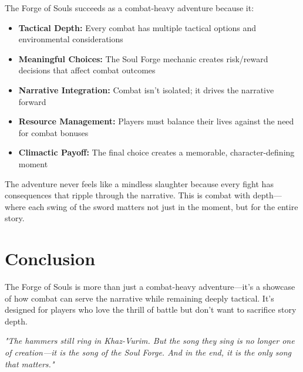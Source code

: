 \documentclass[11pt]{article}
\begin{document}
The Forge of Souls succeeds as a combat-heavy adventure because it:

\begin{itemize}
    \item \textbf{Tactical Depth:} Every combat has multiple tactical options and environmental considerations
    \item \textbf{Meaningful Choices:} The Soul Forge mechanic creates risk/reward decisions that affect combat outcomes
    \item \textbf{Narrative Integration:} Combat isn't isolated; it drives the narrative forward
    \item \textbf{Resource Management:} Players must balance their lives against the need for combat bonuses
    \item \textbf{Climactic Payoff:} The final choice creates a memorable, character-defining moment
\end{itemize}

The adventure never feels like a mindless slaughter because every fight has consequences that ripple through the narrative. This is combat with depth---where each swing of the sword matters not just in the moment, but for the entire story.

\section{Conclusion}

The Forge of Souls is more than just a combat-heavy adventure---it's a showcase of how combat can serve the narrative while remaining deeply tactical. It's designed for players who love the thrill of battle but don't want to sacrifice story depth.

\begin{center}
\textit{"The hammers still ring in Khaz-Vurim. But the song they sing is no longer one of creation---it is the song of the Soul Forge. And in the end, it is the only song that matters."}
\end{center}
\end{document}
